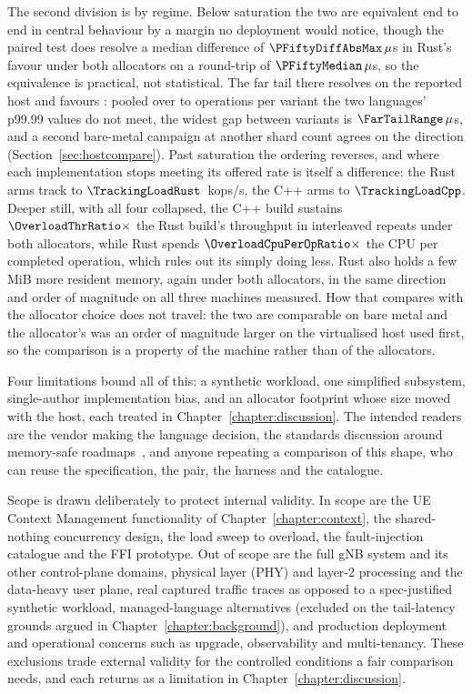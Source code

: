 The second division is by regime. Below saturation the two are equivalent end to end in central
behaviour by a margin no deployment would notice, though the paired test does resolve a median
difference of $\PFiftyDiffAbsMax\,\mu$s in Rust's favour under both allocators on a round-trip of
$\PFiftyMedian\,\mu$s, so the equivalence is practical, not statistical. The far tail there
resolves on the reported host and favours \FarTailLower{}: pooled over \FarTailSamplesMin{} to
\FarTailSamplesMax{} operations per variant the two languages' p99.99 values do not meet, the
widest gap between variants is $\FarTailRange\,\mu$s, and a second bare-metal campaign at another
shard count agrees on the direction (Section~\ref{sec:hostcompare}). Past saturation the ordering
reverses, and where each implementation stops meeting its offered rate is itself a difference:
the Rust arms track to $\TrackingLoadRust$~kops/s, the C++ arms to $\TrackingLoadCpp$. Deeper
still, with all four collapsed, the C++ build sustains $\OverloadThrRatio\times$ the Rust build's
throughput in \OverloadThrAgree{} interleaved repeats under both allocators, while Rust spends
$\OverloadCpuPerOpRatio\times$ the CPU per completed operation, which rules out its simply doing
less. Rust also holds a few MiB more resident memory, again under both allocators, in the same
direction and order of magnitude on all three machines measured. How that compares with the
allocator choice does not travel: the two are comparable on bare metal and the allocator's was an
order of magnitude larger on the virtualised host used first, so the comparison is a property of
the machine rather than of the allocators.

Four limitations bound all of this: a synthetic workload, one simplified subsystem,
single-author implementation bias, and an allocator footprint whose size moved with the host,
each treated in Chapter~\ref{chapter:discussion}. The intended readers are the vendor
making the language decision, the standards discussion around memory-safe
roadmaps~\cite{cisa2023memorysafe,oncd2024building}, and anyone repeating a comparison of this
shape, who can reuse the specification, the pair, the harness and the catalogue.

Scope is drawn deliberately to protect internal validity. In scope are the UE Context Management
functionality of Chapter~\ref{chapter:context}, the shared-nothing concurrency design, the load
sweep to overload, the fault-injection catalogue and the FFI prototype. Out of scope are the full
gNB system and its other control-plane domains, physical layer (PHY) and layer-2 processing and
the data-heavy user plane, real captured traffic traces as opposed to a spec-justified synthetic
workload, managed-language alternatives (excluded on the tail-latency grounds argued in
Chapter~\ref{chapter:background}), and production deployment and operational concerns such as
upgrade, observability and multi-tenancy. These exclusions trade external validity for the
controlled conditions a fair comparison needs, and each returns as a limitation in
Chapter~\ref{chapter:discussion}.

